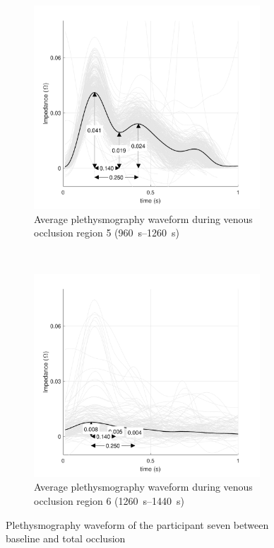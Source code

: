 \begin{figure}[!htbp]
	\centering
	\begin{subfigure}[t]{0.5\textwidth}
		\centering
		\includegraphics[height=7.6cm]{figure10a}
		\caption{Average plethysmography waveform during venous occlusion region 5 (\SIrange{960}{1260}{\second})}
		\label{fig:iPG_total_baseline}
	\end{subfigure}%
	~ 
	\begin{subfigure}[t]{0.5\textwidth}
		\centering
		\includegraphics[height=7.6cm]{figure10b}
		\caption{Average plethysmography waveform during venous occlusion region 6 (\SIrange{1260}{1440}{\second})}
		\label{fig:iPG_total_occlusion}
	\end{subfigure}
	\caption{Plethysmography waveform of the participant seven between baseline and total occlusion}
	\label{fig:iPG_total}
\end{figure}

